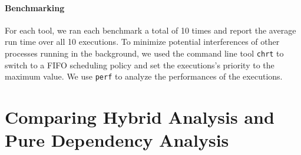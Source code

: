 \paragraph{Benchmarking}
For each tool, we ran each benchmark a total of 10 times and report the average run time over all 10 executions. To minimize potential interferences of other processes running in the background, we used the command line tool \texttt{chrt} to switch to a FIFO scheduling policy and set the executions's priority to the maximum value.
We use \texttt{perf} to analyze the performances of the executions.

\section{Comparing Hybrid Analysis and Pure Dependency Analysis}
